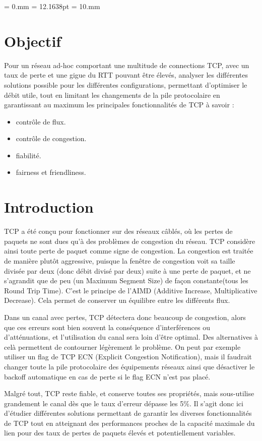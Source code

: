 \documentclass[frenchb]{article}
\begin{document}
\topmargin = 0.mm
\headheight = 12.1638pt
\evensidemargin = 10.mm


\tableofcontents
\clearpage

\section*{Objectif}
Pour un réseau ad-hoc comportant une multitude de connections TCP, avec un taux de perte et une gigue du RTT pouvant être élevés, analyser les différentes solutions possible pour les différentes configurations, permettant d'optimiser le débit utile, tout en limitant les changements de la pile protocolaire en garantissant au maximum les principales fonctionnalités de TCP à savoir :
\begin{itemize}
\item contrôle de flux.
\item contrôle de congestion.
\item fiabilité.
\item fairness et friendliness.
\end{itemize}

\section*{Introduction}
TCP a été conçu pour fonctionner sur des réseaux câblés, où les pertes de paquets ne sont dues qu'à des problèmes de congestion du réseau. TCP considère ainsi toute perte de paquet comme signe de congestion. La congestion est traitée de manière plutôt aggressive, puisque la fenêtre de congestion voit sa taille divisée par deux (donc débit divisé par deux) suite à une perte de paquet, et ne s'agrandit que de peu (un Maximum Segment Size) de façon constante(tous les Round Trip Time). C'est le principe de l'AIMD (Additive Increase, Multiplicative Decrease). Cela permet de conserver un équilibre entre les différents flux.

Dans un canal avec pertes, TCP détectera donc beaucoup de congestion, alors que ces erreurs sont bien souvent la conséquence d'interférences ou d'atténuations, et l'utilisation du canal sera loin d'être optimal. Des alternatives à celà permettent de contourner légèrement le problème. On peut par exemple utiliser un flag de TCP ECN (Explicit Congestion Notification), mais il faudrait changer toute la pile protocolaire des équipements réseaux ainsi que désactiver le backoff automatique en cas de perte si le flag ECN n'est pas placé.

Malgré tout, TCP reste fiable, et conserve toutes ses propriétés, mais sous-utilise grandement le canal dès que le taux d'erreur dépasse les 5\%. Il s'agit donc ici d'étudier différentes solutions permettant de garantir les diverses fonctionnalités de TCP tout en atteignant des performances proches de la capacité maximale du lien pour des taux de pertes de paquets élevés et potentiellement variables.
\end{document}
